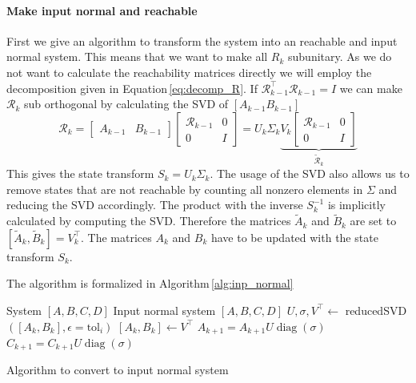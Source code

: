 \documentclass[doctype=mastersthesis,BCOR=15mm,biblatex]{ldvbook}%
\newcommand{\Input}{\Require}
\newcommand{\Output}{\Ensure}
\DeclareMathOperator{\diag}{diag}
\newcommand{\R}{\mathcal{R}} %
\newcommand{\eye}{I} %
\begin{document}
\begin{itemize}
\paragraph{Make input normal and reachable}
First we give an algorithm to transform the system into an reachable and input normal system.
This means that we want to make all $R_k$ subunitary.
As we do not want to calculate the reachability matrices directly we will employ the decomposition given in Equation\,\ref{eq:decomp_R}.
If $\R_{k-1}^\top \R_{k-1}=\eye$ we can make $\R_{k}$ sub orthogonal by calculating the SVD of $[A_{k-1} B_{k-1}]$
\begin{equation}
\R_k = 
\begin{bmatrix}
A_{k-1} & B_{k-1}
\end{bmatrix}
\begin{bmatrix}
\R_{k-1} &0\\
0& \eye
\end{bmatrix}
=U_k\Sigma _k
\underbrace{V_k
\begin{bmatrix}
\R_{k-1} &0\\
0& \eye
\end{bmatrix}}_{\tilde{\R}_k}
\end{equation}
This gives the state transform $S_k = U_k\Sigma_k$. 
The usage of the SVD also allows us to remove states that are not reachable by counting all nonzero elements in $\Sigma$ and reducing the SVD accordingly.
The product with the inverse $S_k^{-1}$ is implicitly calculated by computing the SVD.
Therefore the matrices $\tilde{A}_k$ and $\tilde{B}_k$ are set to $[\tilde{A}_k,\tilde{B}_k]=V_k^\top$.
The matrices $A_{k}$ and $B_{k}$ have to be updated with the state transform $S_k$.

The algorithm is formalized in Algorithm\,\ref{alg:inp_normal}

\begin{algorithm}[htb]
	\begin{algorithmic}
	\Input System $[A,B,C,D]$
	\Output Input normal system $[A,B,C,D]$
		\State $U,\sigma,V^\top \gets$ reducedSVD$([A_k,B_k],\epsilon=\text{tol}_i)$
		\State $[A_k,B_k] \gets V^\top$
		\State $A_{k+1}=A_{k+1}U\diag(\sigma)$
		\State $C_{k+1}=C_{k+1}U\diag(\sigma)$
	\EndFor
	\end{algorithmic}
\caption{Algorithm to convert to input normal system}\label{alg:inp_normal}
\end{algorithm}


\end{itemize}
\end{document}
